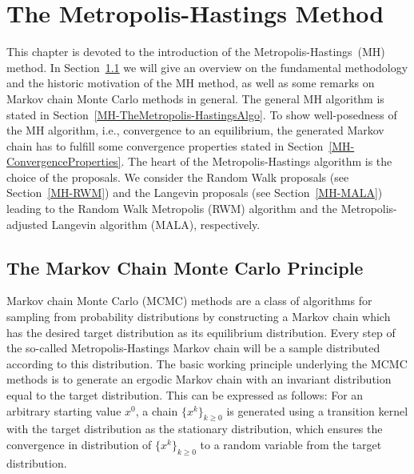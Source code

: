 \chapter{The Metropolis-Hastings Method}
\label{sec:Metropolis-HastingsMethod}


This chapter is devoted to the introduction of the Metropolis-Hastings~(MH) method. In Section~\ref{MH-MCMCPrinciple} we will give an overview on the fundamental methodology and the historic motivation of the MH method, as well as some remarks on Markov chain Monte Carlo methods in general. The general MH algorithm is stated in Section~\ref{MH-TheMetropolis-HastingsAlgo}. To show well-posedness of the MH algorithm, i.e., convergence to an equilibrium, the generated Markov chain has to fulfill some convergence properties stated in Section~\ref{MH-ConvergenceProperties}. The heart of the Metropolis-Hastings algorithm is the choice of the proposals. We consider the Random Walk proposals (see Section~\ref{MH-RWM}) and the Langevin proposals (see Section~\ref{MH-MALA}) leading to the Random Walk Metropolis (RWM) algorithm and the Metropolis-adjusted Langevin algorithm (MALA), respectively.


\section{The Markov Chain Monte Carlo Principle}
\label{MH-MCMCPrinciple}

Markov chain Monte Carlo (MCMC) methods are a class of algorithms for sampling from probability distributions by constructing a Markov chain which has the desired target distribution as its equilibrium distribution. Every step of the so-called Metropolis-Hastings Markov chain will be a sample distributed according to this distribution. The basic working principle underlying the MCMC methods is to generate an ergodic Markov chain with an invariant distribution equal to the target distribution. This can be expressed as follows: For an arbitrary starting value $x^0$, a chain $ \{ x^{k} \}_{k \geq 0} $ is generated using a transition kernel with the target distribution as the stationary distribution, which ensures the convergence in distribution of $ \{ x^{k} \}_{k \geq 0} $ to a random variable from the target distribution.

